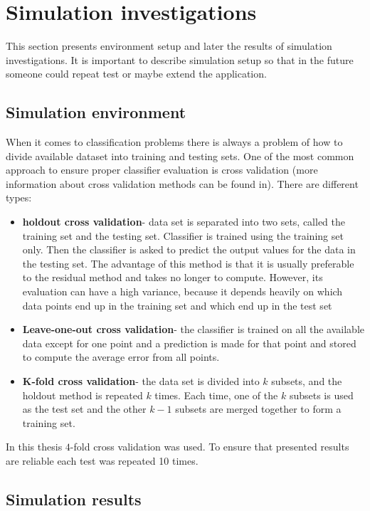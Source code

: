 \section{Simulation investigations}
This section presents environment setup and later the results of simulation
investigations. It is important to describe simulation setup so that in the
future someone could repeat test or maybe extend the application.
\label{cha:Simulation_investugations}
\subsection{Simulation environment}
When it comes to classification problems there is always a problem of how to
divide available dataset into training and testing sets. One of the most common
approach to ensure proper classifier evaluation is cross validation (more
information about cross validation methods can be found in). There are
different types:
\begin{itemize}
    \item \textbf{holdout cross validation}- data set is separated into two sets, called the 
        training set and the testing set. Classifier is trained using the 
        training set only. Then the classifier is asked to predict the output 
        values for the data in the testing set. The advantage of this method is 
        that it is usually preferable to the residual method and takes no longer 
        to compute. However, its evaluation can have a high variance, because
        it depends heavily on which data points end up in the training set and 
        which end up in the test set
    \item \textbf{Leave-one-out cross validation}- the classifier is trained on all the
        available data except for one point and a prediction is made for that
        point and stored to compute the average error from all points. 
    \item \textbf{K-fold cross validation}- the data set is divided into $k$ subsets, 
        and the holdout method is repeated $k$ times. Each time, one of the $k$ subsets 
        is used as the test set and the other $k-1$ subsets are merged together to form 
        a training set.
\end{itemize}
In this thesis $4$-fold cross validation was used. To ensure that presented
results are reliable each test was repeated 10 times.
\label{cha:Simulation_environment}
\subsection{Simulation results}
\label{cha:Simulation_results}
